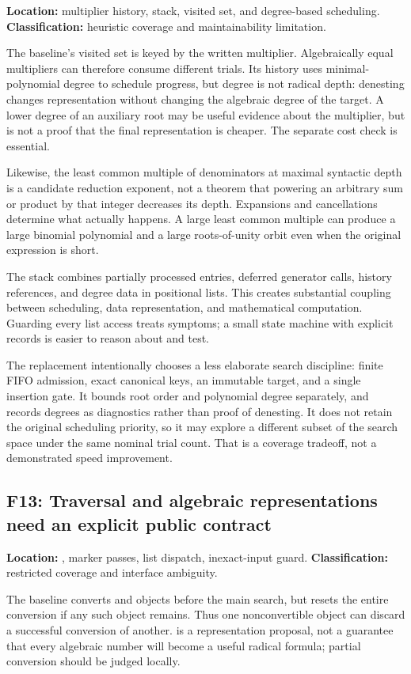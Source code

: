 \documentclass[11pt,letterpaper]{article}
\newcommand{\code}[1]{\texttt{\detokenize{#1}}}
\theoremstyle{definition}
\theoremstyle{remark}
\newcommand{\finding}[2]{\subsection{#1: #2}\label{f:#1}}
\begin{document}
\textbf{Location:} multiplier history, stack, visited set, and degree-based scheduling.
\textbf{Classification:} heuristic coverage and maintainability limitation.

The baseline's visited set is keyed by the written multiplier. Algebraically equal multipliers can therefore consume different trials. Its history uses minimal-polynomial degree to schedule progress, but degree is not radical depth: denesting changes representation without changing the algebraic degree of the target. A lower degree of an auxiliary root may be useful evidence about the multiplier, but is not a proof that the final representation is cheaper. The separate cost check is essential.\cite{baseline,report}

Likewise, the least common multiple of denominators at maximal syntactic depth is a candidate reduction exponent, not a theorem that powering an arbitrary sum or product by that integer decreases its depth. Expansions and cancellations determine what actually happens. A large least common multiple can produce a large binomial polynomial and a large roots-of-unity orbit even when the original expression is short.

The stack combines partially processed entries, deferred generator calls, history references, and degree data in positional lists. This creates substantial coupling between scheduling, data representation, and mathematical computation. Guarding every list access treats symptoms; a small state machine with explicit records is easier to reason about and test.

The replacement intentionally chooses a less elaborate search discipline: finite FIFO admission, exact canonical keys, an immutable target, and a single insertion gate. It bounds root order and polynomial degree separately, and records degrees as diagnostics rather than proof of denesting. It does not retain the original scheduling priority, so it may explore a different subset of the search space under the same nominal trial count. That is a coverage tradeoff, not a demonstrated speed improvement.

\finding{F13}{Traversal and algebraic representations need an explicit public contract}

\textbf{Location:} \code{ToRadicals}, marker passes, list dispatch, inexact-input guard.
\textbf{Classification:} restricted coverage and interface ambiguity.

The baseline converts \code{Root} and \code{AlgebraicNumber} objects before the main search, but resets the entire conversion if any such object remains. Thus one nonconvertible object can discard a successful conversion of another. \code{ToRadicals} is a representation proposal, not a guarantee that every algebraic number will become a useful radical formula; partial conversion should be judged locally.\cite{baseline,toradicals}
\end{document}
